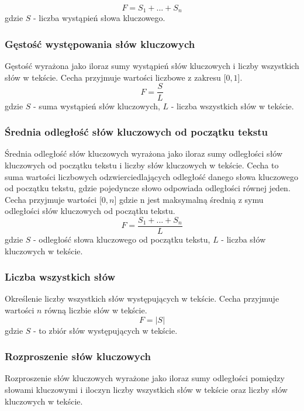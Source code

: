 \documentclass{classrep}
\begin{document}
\begin{equation}
    F=S_{1} + ... + S_{n}
\end{equation}
gdzie $S$ - liczba wystąpień słowa kluczowego.


\subsubsection{Gęstość występowania słów kluczowych}
Gęstość wyrażona jako iloraz sumy wystąpień słów kluczowych i liczby wszystkich słów w tekście.
Cecha przyjmuje wartości liczbowe z zakresu [$0, 1$].
    \begin{equation}
      F=\frac{S}{L}
    \end{equation}
gdzie $S$ - suma wystąpień słów kluczowych, $L$ - liczba wszystkich słów w tekście.


\subsubsection{Średnia odległość słów kluczowych od początku tekstu}
Średnia odległość słów kluczowych wyrażona jako iloraz sumy odległości słów kluczowych od początku tekstu i liczby
słów kluczowych w tekście. Cecha to suma wartości liczbowych odzwierciedlających odległość danego słowa kluczowego
od początku tekstu, gdzie pojedyncze słowo odpowiada odległości równej jeden. Cecha przyjmuje wartości [$0, n$] gdzie n
jest maksymalną średnią z symu odległości słów kluczowych od początku tekstu.
\begin{equation}
    F=\frac{S_{1} + ... + S_{n}}{L}
\end{equation}
gdzie $S$ - odległość słowa kluczowego od początku tekstu, $L$ -  liczba słów kluczowych w tekście.



\subsubsection{Liczba wszystkich słów}
Określenie liczby wszystkich słów występujących w tekście. 
Cecha przyjmuje wartości $n$ równą liczbie słów w tekście.
\begin{equation}
    F=|S|
\end{equation}
gdzie $S$ - to zbiór słów występujących w tekście.

\subsubsection{Rozproszenie słów kluczowych}
Rozproszenie słów kluczowych wyrażone jako iloraz sumy odległości pomiędzy słowami kluczowymi i iloczyn liczby
wszystkich słów w tekście oraz liczby słów kluczowych w tekście.
\end{document}
